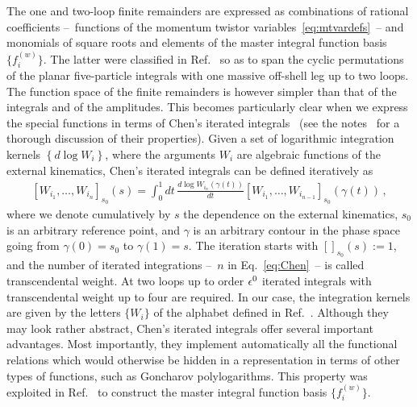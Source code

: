 \documentclass[main.tex]{subfiles}
\begin{document}
The one and two-loop finite remainders are expressed as combinations of rational coefficients --~functions of the momentum twistor variables~\eqref{eq:mtvardefs}~-- and monomials of square roots and elements of the master integral function basis $\{f^{(w)}_i\}$. The latter were classified in Ref.~\cite{Badger:2021nhg} so as to span the cyclic permutations of the planar five-particle integrals with one massive off-shell leg up to two loops. The function space of the finite remainders is however simpler than that of the integrals and of the amplitudes. This becomes particularly clear when we express the special functions in terms of Chen's iterated integrals~\cite{Chen:1977oja} (see the notes~\cite{Brown:2013qva} for a thorough discussion of their properties). Given a set of logarithmic integration kernels $\left\{ d\log W_i \right\}$, where the arguments $W_i$ are algebraic functions of the external kinematics, Chen's iterated integrals can be defined iteratively as
\begin{align} \label{eq:Chen}
\left[W_{i_1}, \ldots, W_{i_n}  \right]_{s_0} (s) = \int_0^1 dt \, \frac{d \log W_{i_n}\left(\gamma(t)\right)}{dt} \left[W_{i_1}, \ldots, W_{i_{n-1}}  \right]_{s_0} \left(\gamma(t)\right) \,,
\end{align}
where we denote cumulatively by $s$ the dependence on the external kinematics, $s_0$ is an arbitrary reference point, and $\gamma$ is an arbitrary contour in the phase space going from $\gamma(0)=s_0$ to $\gamma(1)=s$. The iteration starts with $[]_{s_0}(s) := 1$, and the number of iterated integrations --~$n$ in Eq.~\eqref{eq:Chen}~-- is called transcendental weight. At two loops up to order $\epsilon^0$ iterated integrals with transcendental weight up to four are required. In our case, the integration kernels are given by the letters $\{W_i\}$ of the alphabet defined in Ref.~\cite{Abreu:2020jxa}. 
Although they may look rather abstract, Chen's iterated integrals offer several important advantages. Most importantly, they implement automatically all the functional relations which would otherwise be hidden in a representation in terms of other types of functions, such as Goncharov polylogarithms. This property was exploited in Ref.~\cite{Badger:2021nhg} to construct the master integral function basis $\{f^{(w)}_i\}$. 
\end{document}
